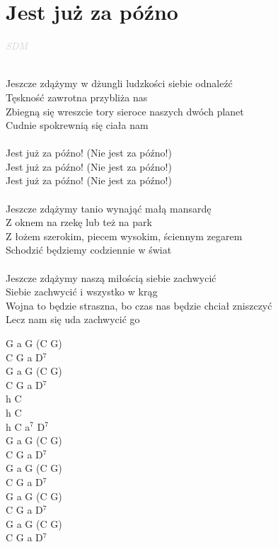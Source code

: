 \documentclass[a5paper, 10pt]{book}
\begin{document}
\section{Jest już za późno}\textcolor{lightgray}{\textit{SDM}}\\~\\
\begin{minipage}[t]{0.8\textwidth}
  Jeszcze zdążymy w dżungli ludzkości siebie odnaleźć\\
  Tęskność zawrotna przybliża nas\\
  Zbiegną się wreszcie tory sieroce naszych dwóch planet\\
  Cudnie spokrewnią się ciała nam\\
  \\
  \hspace*{5mm}Jest już za późno! (Nie jest za późno!)\\
  \hspace*{5mm}Jest już za późno! (Nie jest za późno!)\\
  \hspace*{5mm}Jest już za późno! (Nie jest za późno!)\\
  \\
  Jeszcze zdążymy tanio wynająć małą mansardę\\
  Z oknem na rzekę lub też na park\\
  Z łożem szerokim, piecem wysokim, ściennym zegarem\\
  Schodzić będziemy codziennie w świat\\
  \\
  Jeszcze zdążymy naszą miłością siebie zachwycić\\
  Siebie zachwycić i wszystko w krąg\\
  Wojna to będzie straszna, bo czas nas będzie chciał zniszczyć\\
  Lecz nam się uda zachwycić go\\

\end{minipage}
\begin{minipage}[t]{0.2\textwidth}
  G a G (C G)\\
  C G a D$^7$\\
  G a G (C G)\\
  C G a D$^7$\\

  h C\\
  h C\\
  h C a$^7$ D$^7$\\

  G a G (C G)\\
  C G a D$^7$\\
  G a G (C G)\\
  C G a D$^7$\\

  G a G (C G)\\
  C G a D$^7$\\
  G a G (C G)\\
  C G a D$^7$\\
\end{minipage}
\end{document}
